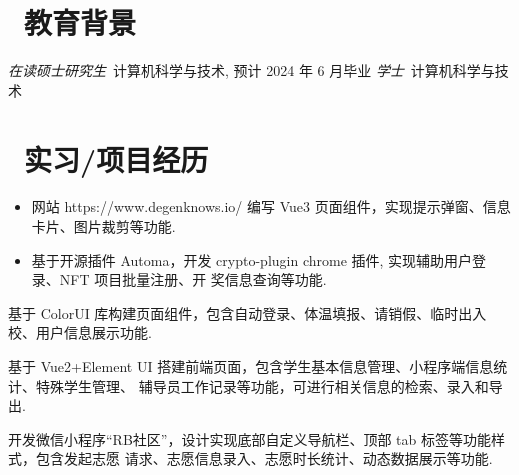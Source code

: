 \documentclass{resume}
\begin{document}


 
\section{\faGraduationCap\  教育背景}
\textit{在读硕士研究生}\ 计算机科学与技术, 预计 2024 年 6 月毕业
\textit{学士}\ 计算机科学与技术

\section{\faUsers\ 实习/项目经历}
\role{实习}{前端开发工程师}
\begin{itemize}
  \item 网站 https://www.degenknows.io/ 编写 Vue3 页面组件，实现提示弹窗、信息卡片、图片裁剪等功能.
  \item 基于开源插件 Automa，开发 crypto-plugin chrome 插件, 实现辅助用户登录、NFT 项目批量注册、开
奖信息查询等功能.
\end{itemize}

\begin{onehalfspacing}
基于 ColorUI 库构建页面组件，包含自动登录、体温填报、请销假、临时出入校、用户信息展示功能.
\end{onehalfspacing}

\begin{onehalfspacing}
基于 Vue2+Element UI 搭建前端页面，包含学生基本信息管理、小程序端信息统计、特殊学生管理、
辅导员工作记录等功能，可进行相关信息的检索、录入和导出.
\end{onehalfspacing}

\begin{onehalfspacing}
开发微信小程序“RB社区”，设计实现底部自定义导航栏、顶部 tab 标签等功能样式，包含发起志愿
请求、志愿信息录入、志愿时长统计、动态数据展示等功能.
\end{onehalfspacing}
\end{document}
